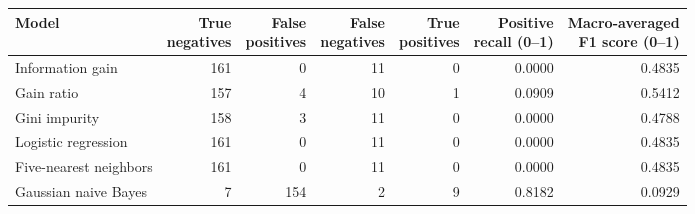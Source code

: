 \begin{tabular}{@{}>{\raggedright\arraybackslash}p{1.05in}rrrrrr@{}}
\toprule
Model & \shortstack{True\\negatives} & \shortstack{False\\positives} & \shortstack{False\\negatives} & \shortstack{True\\positives} & \shortstack{Positive\\recall (0--1)} & \shortstack{Macro-averaged\\F1 score (0--1)} \\
\midrule
Information gain & 161 & 0 & 11 & 0 & 0.0000 & 0.4835 \\
Gain ratio & 157 & 4 & 10 & 1 & 0.0909 & 0.5412 \\
Gini impurity & 158 & 3 & 11 & 0 & 0.0000 & 0.4788 \\
Logistic regression & 161 & 0 & 11 & 0 & 0.0000 & 0.4835 \\
Five-nearest neighbors & 161 & 0 & 11 & 0 & 0.0000 & 0.4835 \\
Gaussian naive Bayes & 7 & 154 & 2 & 9 & 0.8182 & 0.0929 \\
\bottomrule
\end{tabular}

